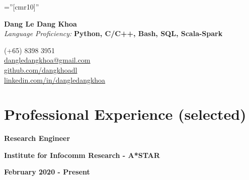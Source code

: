 \documentclass[10pt]{article}
\begin{document}
    \pagestyle{empty}       %
    \font\fb=''[cmr10]''    %

    \begin{multicols}{2}
        \begin{flushleft}
            \textbf{{\Huge Dang Le Dang Khoa }} \\
            \vspace{2mm}
            \emph{Language Proficiency:} \textbf{Python, C/C++, Bash, SQL, Scala-Spark}
        \end{flushleft}

        \columnbreak

        \begin{flushright}
            \textsc (+65) 8398 3951 \\
            \href{mailto:dangledangkhoa@gmail.com}{dangledangkhoa@gmail.com} \\
            \href{https://github.com/dangkhoadl}{github.com/dangkhoadl} \\
            \href{https://sg.linkedin.com/in/dangledangkhoa}{linkedin.com/in/dangledangkhoa}
        \end{flushright}
    \end{multicols}


    \vspace{-5mm}
    \section{Professional Experience (selected)}

        \begin{multicols}{3}
            \begin{flushleft}
                \textbf{Research Engineer}
            \end{flushleft}

            \columnbreak

            \begin{center}
                \textbf{Institute for Infocomm Research - A*STAR}
            \end{center}

            \columnbreak

            \begin{flushright}
                \textbf{February 2020 - Present}
            \end{flushright}
        \end{multicols}
\end{document}
